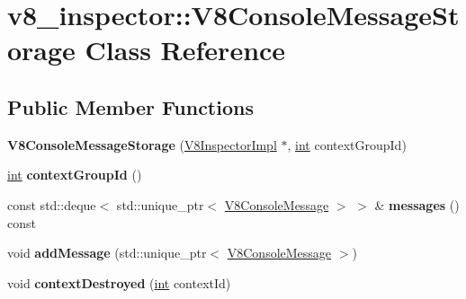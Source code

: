 \hypertarget{classv8__inspector_1_1V8ConsoleMessageStorage}{}\section{v8\+\_\+inspector\+:\+:V8\+Console\+Message\+Storage Class Reference}
\label{classv8__inspector_1_1V8ConsoleMessageStorage}
\subsection*{Public Member Functions}
\begin{DoxyCompactItemize}
\item 
\mbox{\label{classv8__inspector_1_1V8ConsoleMessageStorage_ab1322083d8edffcae61d7209d5baba25}} 
{\bfseries V8\+Console\+Message\+Storage} (\mbox{\hyperlink{classv8__inspector_1_1V8InspectorImpl}{V8\+Inspector\+Impl}} $\ast$, \mbox{\hyperlink{classint}{int}} context\+Group\+Id)
\item 
\mbox{\label{classv8__inspector_1_1V8ConsoleMessageStorage_a801929cb04752734144c5a8b80fee740}} 
\mbox{\hyperlink{classint}{int}} {\bfseries context\+Group\+Id} ()
\item 
\mbox{\label{classv8__inspector_1_1V8ConsoleMessageStorage_a41cddf9321454f95bb64454fe4fd6b46}} 
const std\+::deque$<$ std\+::unique\+\_\+ptr$<$ \mbox{\hyperlink{classv8__inspector_1_1V8ConsoleMessage}{V8\+Console\+Message}} $>$ $>$ \& {\bfseries messages} () const
\item 
\mbox{\label{classv8__inspector_1_1V8ConsoleMessageStorage_a9899881ccf80ccac54181454fa6e1b63}} 
void {\bfseries add\+Message} (std\+::unique\+\_\+ptr$<$ \mbox{\hyperlink{classv8__inspector_1_1V8ConsoleMessage}{V8\+Console\+Message}} $>$)
\item 
\mbox{\label{classv8__inspector_1_1V8ConsoleMessageStorage_a8731f337069d5a0a86fda19f97f7ddf2}} 
void {\bfseries context\+Destroyed} (\mbox{\hyperlink{classint}{int}} context\+Id)
\item 

\end{DoxyCompactItemize}
